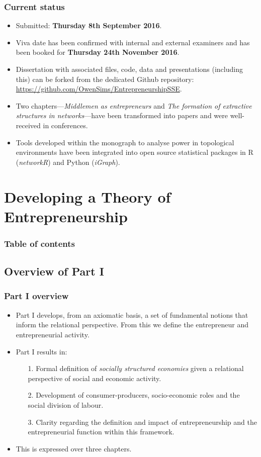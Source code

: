 \documentclass[10pt]{beamer}
\begin{document}
\begin{frame} \frametitle{Current status}
\begin{itemize}
\item Submitted: \textbf{Thursday 8th September 2016}.
\medskip
\item Viva date has been confirmed with internal and external examiners and has been booked for \textbf{Thursday 24th November 2016}.
\medskip
\item Dissertation with associated files, code, data and presentations (including this) can be forked from the dedicated Github repository: \href{https://github.com/OwenSims/EntrepreneurshipSSE}{https://github.com/OwenSims/EntrepreneurshipSSE}.
\medskip
\item Two chapters---\emph{Middlemen as entrepreneurs} and \emph{The formation of extractive structures in networks}---have been transformed into papers and were well-received in conferences.
\medskip
\item Tools developed within the monograph to analyse power in topological environments have been integrated into open source statistical packages in R (\emph{networkR}) and Python (\emph{iGraph}).
\end{itemize}
\end{frame}

\section{Developing a Theory of Entrepreneurship}

\begin{frame}
\frametitle{Table of contents}
\tableofcontents[currentsection]
\end{frame}

\subsection{Overview of Part I}

\begin{frame} \frametitle{Part I overview}
\begin{itemize}
\item Part I develops, from an axiomatic basis, a set of fundamental notions that inform the relational perspective. From this we define the entrepreneur and entrepreneurial activity.
\medskip
\item Part I results in:
\begin{itemize}
\medskip
\item[1.] Formal definition of \emph{socially structured economies} given a relational perspective of social and economic activity.
\medskip
\item[2.] Development of consumer-producers, socio-economic roles and the social division of labour.
\medskip
\item[3.] Clarity regarding the definition and impact of entrepreneurship and the entrepreneurial function within this framework.
\end{itemize}
\medskip
\item This is expressed over three chapters.
\end{itemize}
\end{frame}
\end{document}
